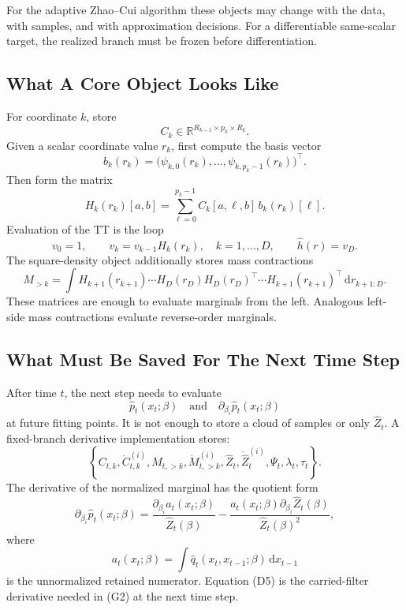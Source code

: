 \documentclass[11pt]{article}
\newcommand{\R}{\mathbb R}
\newcommand{\dd}{\,\mathrm d}
\begin{document}
For the adaptive Zhao--Cui algorithm these objects may change with the data,
with samples, and with approximation decisions.  For a differentiable
same-scalar target, the realized branch must be frozen before differentiation.

\subsection{What A Core Object Looks Like}

For coordinate \(k\), store
\[
    C_k\in\R^{R_{k-1}\times p_k\times R_k}.
\]
Given a scalar coordinate value \(r_k\), first compute the basis vector
\[
    b_k(r_k)=
    \bigl(\psi_{k,0}(r_k),\ldots,\psi_{k,p_k-1}(r_k)\bigr)^\top.
\]
Then form the matrix
\[
    H_k(r_k)[a,b]
    =
    \sum_{\ell=0}^{p_k-1}C_k[a,\ell,b]\,b_k(r_k)[\ell].
    \tag{D1}
\]
Evaluation of the TT is the loop
\[
    v_0=1,\qquad
    v_k=v_{k-1}H_k(r_k),\quad k=1,\ldots,D,
    \qquad
    \widehat h(r)=v_D.
    \tag{D2}
\]
The square-density object additionally stores mass contractions
\[
    M_{>k}
    =
    \int H_{k+1}(r_{k+1})\cdots H_D(r_D)
    H_D(r_D)^\top\cdots H_{k+1}(r_{k+1})^\top
    \dd r_{k+1:D}.
    \tag{D3}
\]
These matrices are enough to evaluate marginals from the left.  Analogous
left-side mass contractions evaluate reverse-order marginals.

\subsection{What Must Be Saved For The Next Time Step}

After time \(t\), the next step needs to evaluate
\[
    \widehat p_t(x_t;\beta)
    \quad\text{and}\quad
    \partial_{\beta_i}\widehat p_t(x_t;\beta)
\]
at future fitting points.  It is not enough to store a cloud of samples or only
\(\widehat Z_t\).  A fixed-branch derivative implementation stores:
\[
    \left\{
    C_{t,k},\dot C_{t,k}^{(i)},M_{t,>k},\dot M_{t,>k}^{(i)},
    \widehat Z_t,\dot{\widehat Z}_t^{(i)},
    \Psi_t,\lambda_t,\tau_t
    \right\}.
    \tag{D4}
\]
The derivative of the normalized marginal has the quotient form
\[
    \partial_{\beta_i}\widehat p_t(x_t;\beta)
    =
    \frac{\partial_{\beta_i}a_t(x_t;\beta)}{\widehat Z_t(\beta)}
    -
    \frac{a_t(x_t;\beta)\partial_{\beta_i}\widehat Z_t(\beta)}
    {\widehat Z_t(\beta)^2},
    \tag{D5}
\]
where
\[
    a_t(x_t;\beta)
    =
    \int \widehat q_t(x_t,x_{t-1};\beta)\dd x_{t-1}
    \tag{D6}
\]
is the unnormalized retained numerator.  Equation (D5) is the carried-filter
derivative needed in (G2) at the next time step.
\end{document}
